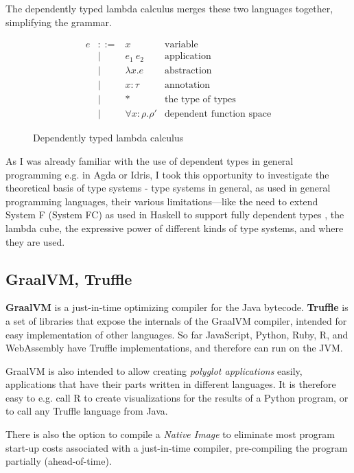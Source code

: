 \documentclass{SPFIT}
\begin{document}
The dependently typed lambda calculus merges these two languages together,
simplifying the grammar.

\begin{figure}[!htpb]
\[\begin{array}{ccll}
e & ::= & x           & \text{variable} \\
  & |   & e_1~e_2      & \text{application} \\
  & |   & \lambda x. e & \text{abstraction} \\
  & |   & x:\tau      & \text{annotation} \\
  & |   & *           & \text{the type of types} \\
  & |   & \forall x:\rho.\rho' & \text{dependent function space}
\end{array}\]
\caption{Dependently typed lambda calculus}
\end{figure}

As I was already familiar with the use of dependent types in general programming
e.g.  in Agda or Idris, I took this opportunity to investigate the theoretical
basis of type systems - type systems in general, as used in general programming
languages, their various limitations---like the need to extend System F (System
FC) as used in Haskell to support fully dependent types
\cite{eisenberg2016dependent}, the lambda cube, the expressive power of
different kinds of type systems, and where they are used.

\subsection{GraalVM, Truffle}
\label{sec:orgf8262ba}
\textbf{GraalVM} is a just-in-time optimizing compiler for the Java bytecode. \textbf{Truffle} is
a set of libraries that expose the internals of the GraalVM compiler, intended
for easy implementation of other languages. So far JavaScript, Python, Ruby, R,
and WebAssembly have Truffle implementations, and therefore can run on the JVM.

GraalVM is also intended to allow creating \emph{polyglot applications} easily,
applications that have their parts written in different languages. It is
therefore easy to e.g. call R to create visualizations for the results of a
Python program, or to call any Truffle language from Java.

There is also the option to compile a \emph{Native Image} to eliminate most program
start-up costs associated with a just-in-time compiler, pre-compiling the
program partially (ahead-of-time).
\end{document}
